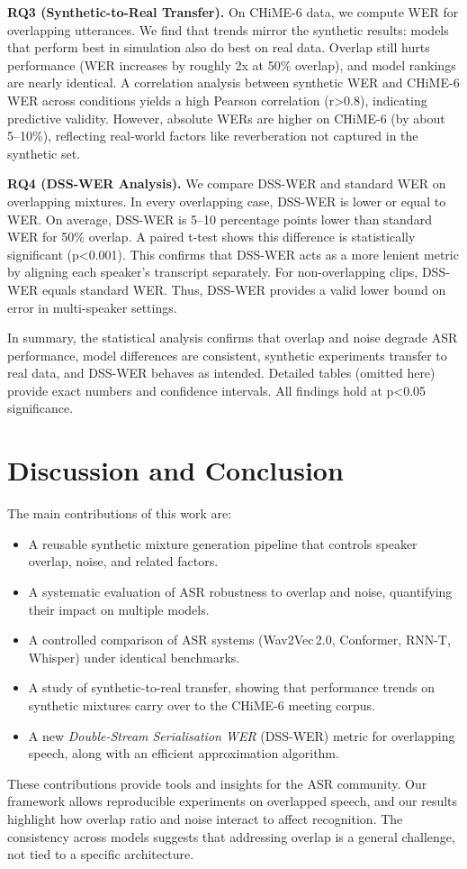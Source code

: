 \documentclass[11pt,a4paper]{report}
\begin{document}
\textbf{RQ3 (Synthetic-to-Real Transfer).} On CHiME-6 data, we compute WER for overlapping utterances. We find that trends mirror the synthetic results: models that perform best in simulation also do best on real data. Overlap still hurts performance (WER increases by roughly 2x at 50\% overlap), and model rankings are nearly identical. A correlation analysis between synthetic WER and CHiME-6 WER across conditions yields a high Pearson correlation (r>0.8), indicating predictive validity. However, absolute WERs are higher on CHiME-6 (by about 5–10\%), reflecting real-world factors like reverberation not captured in the synthetic set.

\textbf{RQ4 (DSS-WER Analysis).} We compare DSS-WER and standard WER on overlapping mixtures. In every overlapping case, DSS-WER is lower or equal to WER. On average, DSS-WER is 5–10 percentage points lower than standard WER for 50\% overlap. A paired t-test shows this difference is statistically significant (p<0.001). This confirms that DSS-WER acts as a more lenient metric by aligning each speaker's transcript separately. For non-overlapping clips, DSS-WER equals standard WER. Thus, DSS-WER provides a valid lower bound on error in multi-speaker settings.

In summary, the statistical analysis confirms that overlap and noise degrade ASR performance, model differences are consistent, synthetic experiments transfer to real data, and DSS-WER behaves as intended. Detailed tables (omitted here) provide exact numbers and confidence intervals. All findings hold at p<0.05 significance.

\chapter{Discussion and Conclusion}
The main contributions of this work are:
\begin{itemize}
  \item A reusable synthetic mixture generation pipeline that controls speaker overlap, noise, and related factors.
  \item A systematic evaluation of ASR robustness to overlap and noise, quantifying their impact on multiple models.
  \item A controlled comparison of ASR systems (Wav2Vec\,2.0, Conformer, RNN-T, Whisper) under identical benchmarks.
  \item A study of synthetic-to-real transfer, showing that performance trends on synthetic mixtures carry over to the CHiME-6 meeting corpus.
  \item A new \emph{Double-Stream Serialisation WER} (DSS-WER) metric for overlapping speech, along with an efficient approximation algorithm.
\end{itemize}
These contributions provide tools and insights for the ASR community. Our framework allows reproducible experiments on overlapped speech, and our results highlight how overlap ratio and noise interact to affect recognition. The consistency across models suggests that addressing overlap is a general challenge, not tied to a specific architecture.
\end{document}

